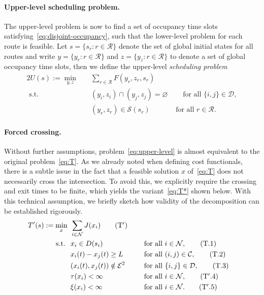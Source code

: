 \documentclass{report}
\theoremstyle{definition}
\theoremstyle{plain}
\begin{document}
\paragraph{Upper-level scheduling problem.}
The upper-level problem is now to find a set of occupancy time slots
satisfying~\eqref{eq:disjoint-occupancy}, such that the lower-level problem for each route is feasible.
Let $s = \{s_{r} : r \in \mathcal{R} \}$ denote the set of global initial states for
all routes and write $y = \{y_{r} : r \in \mathcal{R} \}$ and
$z = \{y_{z} : r \in \mathcal{R}\}$ to denote a set of global occupancy time slots,
then we define the upper-level \emph{scheduling problem}
%
\begin{alignat}{2}\label{eq:upper-level}
  U(s) := \min_{y, z} \quad & \sum_{r \in \mathcal{R}} F({y}_{r}, {z}_{r}, s_{r}) \tag{U} \\
  \text{ s.t. } \quad & (y_{i},z_{i}) \cap (y_{j},z_{j}) = \varnothing & \quad \text{ for all } \{i, j\} \in \mathcal{D} , \tag{U.1} \label{eq:U1} \\
                            & ({y}_{r}, {z}_{r}) \in \mathcal{S}(s_{r}) & \text{ for all } r \in \mathcal{R} . \tag{U.2}
\end{alignat}

\paragraph{Forced crossing.}
Without further assumptions, problem~\eqref{eq:upper-level} is almost equivalent to the original problem~\eqref{eq:T}.
%
As we already noted when defining cost functionals, there is a subtle issue in the fact
that a feasible solution $x$ of~\eqref{eq:T} does not necessarily cross the intersection.
%
To avoid this, we explicitly require the crossing and exit times to be finite,
which yields the variant~\eqref{eq:T*} shown below. With this technical assumption, we
briefly sketch how validity of the decomposition can be established rigorously.
\begin{alignat}{3}\label{eq:T*}
  T'(s) := \min_{x} \;\, & \sum_{i \in \mathcal{N}} J(x_{i}) \tag{$\mathrm{T}'$} \\
  \text{s.t. } \; & x_{i} \in D(s_{i}) && \quad \text{ for all } i \in \mathcal{N} , \tag{T.1} \\
           & x_{i}(t) - x_{j}(t) \geq L && \quad \text{ for all } (i,j) \in \mathcal{C} , \tag{T.2} \\
           & (x_{i}(t), x_{j}(t)) \notin \mathcal{E}^{2} && \quad\text{ for all } \{i, j\} \in \mathcal{D} , \tag{T.3} \label{eq:T*.3} \\
           & \tau(x_{i}) < \infty && \quad \text{ for all } i \in \mathcal{N} , \tag{$\mathrm{T}'.4$} \label{eq:T4*} \\
           & \xi(x_{i}) < \infty && \quad  \text{ for all } i \in \mathcal{N} . \tag{$\mathrm{T}'.5$} \label{eq:T5*}
\end{alignat}
\end{document}
